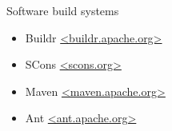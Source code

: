 \documentclass[8pt]{beamer}
\begin{document}
\begin{frame}[fragile]{}
\begin{columns}
\begin{column}{0.33\textwidth}
\begin{block}{Software build systems}
\begin{itemize}
          \begin{itemize}
          \item Buildr \url{<buildr.apache.org>}
          \item SCons \url{<scons.org>}
          \item Maven \url{<maven.apache.org>}
          \item Ant \url{<ant.apache.org>}
          \end{itemize}
        \end{itemize}
      \end{block}
    \end{column}
  \end{columns}
\end{frame}

\end{document}
